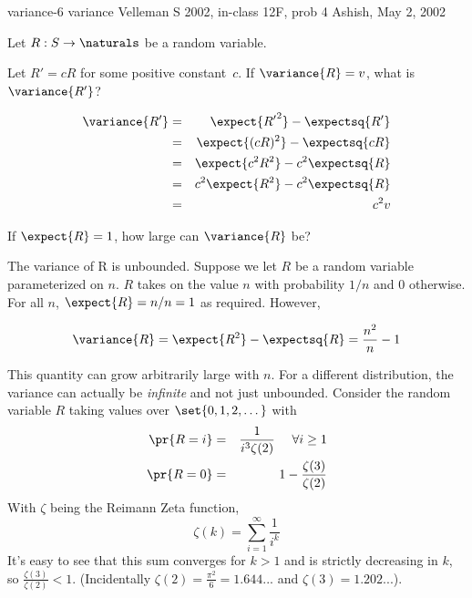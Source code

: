         \problemdata       %
        {variance-6}             %
        {variance}               %
        {Velleman}               %
        {S 2002, in-class 12F, prob 4} %
        {Ashish, May 2, 2002}        %

\begin{problem}
Let $R:S\rightarrow \naturals$ be a random variable.
\begin{problemparts}
\problempart
Let $R'=cR$ for some positive constant~$c$.
If $\variance{R} = v$, what is $\variance{R'}$?

\begin{solution}
\begin{eqnarray*}
\variance{R'} 
& = & \expect{{R'}^2} - \expectsq{R'} \\
& = & \expect{(cR)^2} - \expectsq{cR} \\
& = & \expect{c^2R^2} - c^2\expectsq{R} \\
& = & c^2\expect{R^2} - c^2\expectsq{R} \\
& = & c^2 v \\
\end{eqnarray*}
\end{solution}

\problempart
If $\expect{R}=1$, how large can $\variance{R}$ be?

\begin{solution}

The variance of R is unbounded. Suppose we let $R$ be a random
variable parameterized on $n$. $R$ takes on the value $n$ with
probability $1/n$ and 0 otherwise. For all $n$, $\expect{R} = n/n = 1$
as required.  However,

\[
\variance{R} = \expect{R^2} - \expectsq{R}= \frac{n^2}{n} - 1
\]

This quantity can grow arbitrarily large with $n$.  For a different
distribution, the variance can actually be \emph{infinite} and not
just unbounded.  Consider the random variable $R$ taking values over
$\set{0, 1, 2, \dots}$ with
\begin{eqnarray*}
\pr{R=i}&=&\frac{1}{i^3\zeta(2)}~~~~\forall i\geq 1\\
\pr{R=0}&=&1-\frac{\zeta(3)}{\zeta(2)}
\end{eqnarray*}
With $\zeta$ being the Reimann Zeta function,
\[
\zeta(k)=\sum_{i=1}^\infty\frac{1}{i^k}
\]
It's easy to see that this sum converges for $k>1$ and is strictly
decreasing in $k$, so $\frac{\zeta(3)}{\zeta(2)}<1$.  (Incidentally
$\zeta(2)=\frac{\pi^2}{6}=1.644...$ and $\zeta(3)=1.202...$).


\end{solution}
\end{problemparts}
\end{problem}
